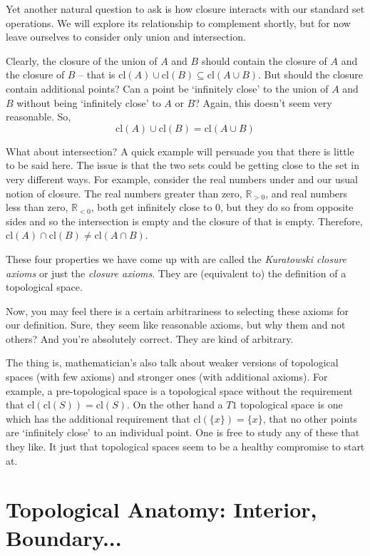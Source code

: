 \documentclass{report}
\newcommand{\cl}{\mathrm{cl}}
\begin{document}
Yet another natural question to ask is how closure interacts with our standard set operations. We will explore its relationship to complement shortly, but for now leave ourselves to consider only union and intersection.

Clearly, the closure of the union of $A$ and $B$ should contain the closure of $A$ and the closure of $B$ -- that is $\cl(A)∪\cl(B) ⊆ \cl(A∪B)$. But should the closure contain additional points? Can a point be `infinitely close' to the union of $A$ and $B$ without being `infinitely close' to $A$ or $B$? Again, this doesn't seem very reasonable. So, $$\cl(A)∪\cl(B) = \cl(A∪B)$$

What about intersection? A quick example will persuade you that there is little to be said here. The issue is that the two sets could be getting close to the set in very different ways. For example, consider the real numbers under and our usual notion of closure. The real numbers greater than zero, $ℝ_{>0}$, and real numbers less than zero, $ℝ_{<0}$, both get infinitely close to $0$, but they do so from opposite sides and so the intersection is empty and the closure of that is empty. Therefore, $\cl(A)∩\cl(B) ≠ \cl(A∩B)$.

These four properties we have come up with are called the \emph{Kuratowski closure axioms} or just the \emph{closure axioms}. They are (equivalent to) the definition of a topological space.

Now, you may feel there is a certain arbitrariness to selecting these axioms for our definition. Sure, they seem like reasonable axioms, but why them and not others? And you're absolutely correct. They are kind of arbitrary.

The thing is, mathematician's also talk about weaker versions of topological spaces (with few axioms) and stronger ones (with additional axioms). For example, a pre-topological space is a topological space without the requirement that $\cl(\cl(S)) = \cl(S)$. On the other hand a $T1$ topological space is one which has the additional requirement that $\cl(\{x\}) = \{x\}$, that no other points are `infinitely close' to an individual point. One is free to study any of these that they like. It just that topological spaces seem to be a healthy compromise to start at.

\section{Topological Anatomy: Interior, Boundary...}
\end{document}
